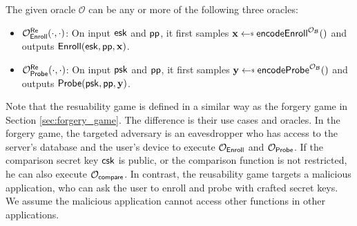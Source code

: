 The given oracle $\mathcal{O}$ can be any or more of the following three oracles:

\begin{itemize}
	\item $\mathcal{O}_{\sf Enroll}^{ {\sf Re}} (\cdot, \cdot)$: On input ${\sf esk}$ and ${\sf pp}$, it first samples $\mathbf{x} \getsdollar {\sf encodeEnroll}^{\mathcal{O}_{\mathcal{B}}}()$ and outputs ${\sf Enroll}({\sf esk}, {\sf pp}, \mathbf{x})$.
	
	\item $\mathcal{O}_{\sf Probe}^{ {\sf Re}} (\cdot, \cdot)$: On input ${\sf psk}$ and ${\sf pp}$, it first samples $\mathbf{y} \getsdollar {\sf encodeProbe}^{\mathcal{O}_{\mathcal{B}}}()$ and outputs ${\sf Probe}({\sf psk}, {\sf pp}, \mathbf{y})$.

\end{itemize}

Note that the resuability game is defined in a similar way as the forgery game in Section \ref{sec:forgery_game}. The difference is their use cases and oracles. In the forgery game, the targeted adversary is an eavesdropper who has access to the server's database and the user's device to execute $\mathcal{O}_{\sf Enroll}$ and $\mathcal{O}_{\sf Probe}$. If the comparison secret key ${\sf csk}$ is public, or the comparison function is not restricted, he can also execute $\mathcal{O}_{\sf compare}$. In contrast, the reusability game targets a malicious application, who can ask the user to enroll and probe with crafted secret keys. We assume the malicious application cannot access other functions in other applications.








% 

\nocite{*}
\printbibliography




